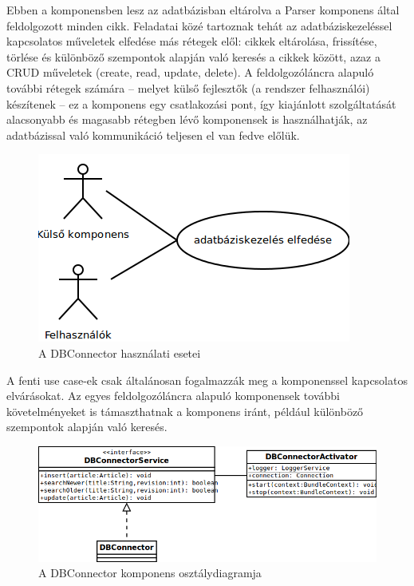 Ebben a komponensben lesz az adatbázisban eltárolva a Parser komponens által feldolgozott minden cikk. Feladatai közé tartoznak tehát az adatbáziskezeléssel kapcsolatos műveletek elfedése más rétegek elől: cikkek eltárolása, frissítése, törlése és különböző szempontok alapján való keresés a cikkek között, azaz a CRUD műveletek (create, read, update, delete). A feldolgozóláncra alapuló további rétegek számára -- melyet külső fejlesztők (a rendszer felhasználói) készítenek -- ez a komponens egy csatlakozási pont, így kiajánlott szolgáltatását alacsonyabb és magasabb rétegben lévő komponensek is használhatják, az adatbázissal való kommunikáció teljesen el van fedve előlük.

\begin{figure}[htp]
\centering
\includegraphics[scale=0.6]{img/usecase_dbconnector}
\caption{A DBConnector használati esetei}
\label{fig:usecase_dbconnector}
\end{figure}

A fenti use case-ek csak általánosan fogalmazzák meg a komponenssel kapcsolatos elvárásokat. Az egyes feldolgozóláncra alapuló komponensek további követelményeket is támaszthatnak a komponens iránt, például különböző szempontok alapján való keresés.

\begin{figure}[htp]
\centering
\includegraphics[scale=0.55]{img/class_dbconnector}
\caption{A DBConnector komponens osztálydiagramja}
\label{fig:}
\end{figure}

